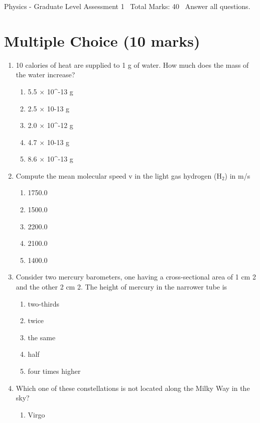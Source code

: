 \documentclass[12pt]{article}
\begin{document}
\begin{center}
Physics - Graduate Level Assessment 1 \
Total Marks: 40 \
Answer all questions.
\end{center}

\section*{Multiple Choice (10 marks)}
\begin{enumerate}[label=\arabic*.]
\item 10 calories of heat are supplied to 1 g of water. How much does the mass of the water increase?
\begin{enumerate}[label=(\alph*)]
    \item 5.5 \ensuremath{\times} 10^-13 g
    \item 2.5 \ensuremath{\times} 10-13 g
    \item 2.0 \ensuremath{\times} 10^-12 g
    \item 4.7 \ensuremath{\times} 10-13 g
    \item 8.6 \ensuremath{\times} 10^-13 g
\end{enumerate}
\item Compute the mean molecular speed v in the light gas hydrogen (H$_{2}$) in m/s
\begin{enumerate}[label=(\alph*)]
    \item 1750.0
    \item 1500.0
    \item 2200.0
    \item 2100.0
    \item 1400.0
\end{enumerate}
\item Consider two mercury barometers, one having a cross-sectional area of 1 cm 2 and the other 2 cm 2. The height of mercury in the narrower tube is
\begin{enumerate}[label=(\alph*)]
    \item two-thirds
    \item twice
    \item the same
    \item half
    \item four times higher
\end{enumerate}
\item Which one of these constellations is not located along the Milky Way in the sky?
\begin{enumerate}[label=(\alph*)]
    \item Virgo

\end{enumerate}
\end{enumerate}
\end{document}
